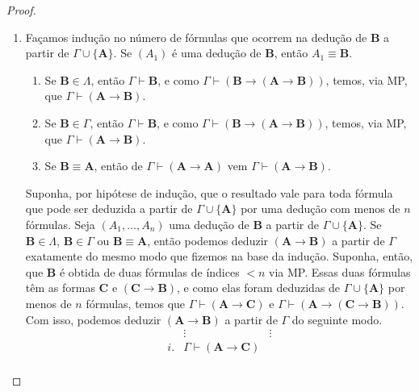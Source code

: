 \begin{proof}
    \leavevmode
        \begin{enumerate}[leftmargin=*, align=left, label=\textbf{(\alph*)}]
            \item Façamos indução no número de fórmulas que ocorrem na dedução de $\mathbf{B}$ a partir de $\Gamma \cup \{\mathbf{A}\}$. Se $(A_1)$ é uma dedução de $\mathbf{B}$, então $A_1 \equiv \mathbf{B}$.
                \begin{enumerate}[label=\roman*.]
                    \item Se $\mathbf{B} \in \Lambda$, então $\Gamma \vdash \mathbf{B}$, e como $\Gamma \vdash (\mathbf{B} \rightarrow (\mathbf{A} \rightarrow \mathbf{B}))$, temos, via MP, que $\Gamma \vdash (\mathbf{A} \rightarrow \mathbf{B})$.
                    \item Se $\mathbf{B} \in \Gamma$, então $\Gamma \vdash \mathbf{B}$, e como $\Gamma \vdash (\mathbf{B} \rightarrow (\mathbf{A} \rightarrow \mathbf{B}))$, temos, via MP, que $\Gamma \vdash (\mathbf{A} \rightarrow \mathbf{B})$.
                    \item Se $\mathbf{B} \equiv \mathbf{A}$, então de $\Gamma \vdash (\mathbf{A} \rightarrow \mathbf{A})$ vem $\Gamma \vdash (\mathbf{A} \rightarrow \mathbf{B})$.
                \end{enumerate}
            Suponha, por hipótese de indução, que o resultado vale para toda fórmula que pode ser deduzida a partir de $\Gamma \cup \{\mathbf{A}\}$ por uma dedução com menos de $n$ fórmulas. Seja $(A_1, \ldots, A_n)$ uma dedução de $\mathbf{B}$ a partir de $\Gamma \cup \{\mathbf{A}\}$. Se $\mathbf{B} \in \Lambda$, $\mathbf{B} \in \Gamma$ ou $\mathbf{B} \equiv \mathbf{A}$, então podemos deduzir $(\mathbf{A} \rightarrow \mathbf{B})$ a partir de $\Gamma$ exatamente do mesmo modo que fizemos na base da indução. Suponha, então, que $\mathbf{B}$ é obtida de duas fórmulas de índices $<n$ via MP. Essas duas fórmulas têm as formas $\mathbf{C}$ e $(\mathbf{C} \rightarrow \mathbf{B})$, e como elas foram deduzidas de $\Gamma \cup \{\mathbf{A}\}$ por menos de $n$ fórmulas, temos que $\Gamma \vdash (\mathbf{A} \rightarrow \mathbf{C})$ e $\Gamma \vdash (\mathbf{A} \rightarrow (\mathbf{C} \rightarrow \mathbf{B}))$. Com isso, podemos deduzir $(\mathbf{A} \rightarrow \mathbf{B})$ a partir de $\Gamma$ do seguinte modo.
                \[
                    \begin{array}{rll}
                        & \vdots & \vdots \\
                        i. & \Gamma \vdash (\mathbf{A} \rightarrow \mathbf{C}) & \\

\end{array}\]
\end{enumerate}
\end{proof}
